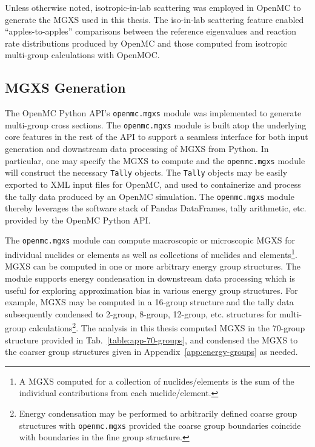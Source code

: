 Unless otherwise noted, isotropic-in-lab scattering was employed in OpenMC to generate the \ac{MGXS} used in this thesis. The iso-in-lab scattering feature enabled ``apples-to-apples'' comparisons between the reference eigenvalues and reaction rate distributions produced by OpenMC and those computed from isotropic multi-group calculations with OpenMOC.

\subsection{MGXS Generation}
\label{subsec:chap4-mgxs}

The OpenMC Python \ac{API}'s \texttt{openmc.mgxs} module was implemented to generate multi-group cross sections. The \texttt{openmc.mgxs} module is built atop the underlying core features in the rest of the \ac{API} to support a seamless interface for both input generation and downstream data processing of \ac{MGXS} from Python. In particular, one may specify the \ac{MGXS} to compute and the \texttt{openmc.mgxs} module will construct the necessary \texttt{Tally} objects. The \texttt{Tally} objects may be easily exported to \ac{XML} input files for OpenMC, and used to containerize and process the tally data produced by an OpenMC simulation. The \texttt{openmc.mgxs} module thereby leverages the software stack of Pandas DataFrames, tally arithmetic, etc. provided by the OpenMC Python \ac{API}.

The \texttt{openmc.mgxs} module can compute macroscopic or microscopic \ac{MGXS} for individual nuclides or elements as well as collections of nuclides and elements\footnote{A \ac{MGXS} computed for a collection of nuclides/elements is the sum of the individual contributions from each nuclide/element.}. \ac{MGXS} can be computed in one or more arbitrary energy group structures. The module supports energy condensation in downstream data processing which is useful for exploring approximation bias in various energy group structures. For example, \ac{MGXS} may be computed in a 16-group structure and the tally data subsequently condensed to 2-group, 8-group, 12-group, etc. structures for multi-group calculations\footnote{Energy condensation may be performed to arbitrarily defined coarse group structures with \texttt{openmc.mgxs} provided the coarse group boundaries coincide with boundaries in the fine group structure.}. The analysis in this thesis computed \ac{MGXS} in the 70-group structure provided in Tab.~\ref{table:app-70-groups}, and condensed the \ac{MGXS} to the coarser group structures given in Appendix~\ref{app:energy-groups} as needed.

